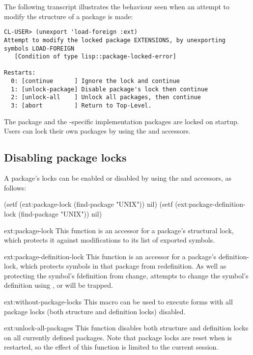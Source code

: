 The following transcript illustrates the behaviour seen when an
attempt to modify the structure of a package is made:

\begin{verbatim}
CL-USER> (unexport 'load-foreign :ext)
Attempt to modify the locked package EXTENSIONS, by unexporting symbols LOAD-FOREIGN
   [Condition of type lisp::package-locked-error]

Restarts:
  0: [continue      ] Ignore the lock and continue
  1: [unlock-package] Disable package's lock then continue
  2: [unlock-all    ] Unlock all packages, then continue
  3: [abort         ] Return to Top-Level.
\end{verbatim}


The  package and the \cmucl{}-specific
implementation packages are locked on startup. Users can lock their
own packages by using the  and
 accessors.



\subsection{Disabling package locks}

A package's locks can be enabled or disabled by using the
 and 
accessors, as follows:

\begin{lisp}
   (setf (ext:package-lock (find-package "UNIX")) nil)
   (setf (ext:package-definition-lock (find-package "UNIX")) nil)
\end{lisp}


\begin{defun}{ext:}{package-lock}{}
  This function is an accessor for a package's structural lock, which
  protects it against modifications to its list of exported symbols.
\end{defun}


\begin{defun}{ext:}{package-definition-lock}{}
  This function is an accessor for a package's definition-lock, which
  protects symbols in that package from redefinition. As well as
  protecting the symbol's fdefinition from change, attempts to change
  the symbol's definition using ,  or
   will be trapped.
\end{defun}


\begin{defmac}{ext:}{without-package-locks}{}
  This macro can be used to execute forms with all package locks (both
  structure and definition locks) disabled. 
\end{defmac}


\begin{defun}{ext:}{unlock-all-packages}{}
  This function disables both structure and definition locks on all
  currently defined packages. Note that package locks are reset when
  \cmucl{} is restarted, so the effect of this function is limited to
  the current session. 
\end{defun}


